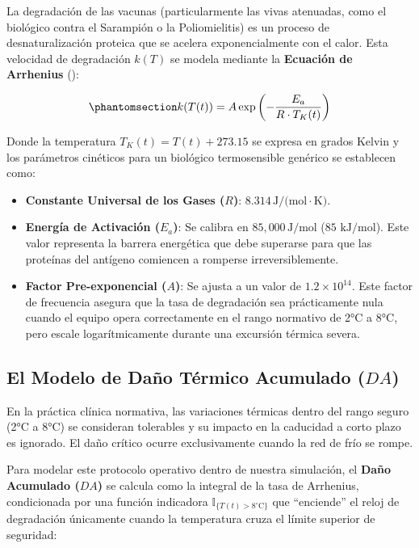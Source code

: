\documentclass[
  spanish,
  letterpaper,
  DIV=11,
  numbers=noendperiod]{scrreprt}
\providecommand{\tightlist}{%
  \setlength{\itemsep}{0pt}\setlength{\parskip}{0pt}}
\theoremstyle{plain}
\theoremstyle{definition}
\theoremstyle{remark}
\begin{document}
La degradación de las vacunas (particularmente las vivas atenuadas, como
el biológico contra el Sarampión o la Poliomielitis) es un proceso de
desnaturalización proteica que se acelera exponencialmente con el calor.
Esta velocidad de degradación \(k(T)\) se modela mediante la
\textbf{Ecuación de Arrhenius} ():

\begin{equation}\phantomsection\label{eq-Arrhenius}{
k(T(t)) = A \exp\left(-\frac{E_a}{R \cdot T_K(t)}\right)
}\end{equation}

Donde la temperatura \(T_K(t) = T(t) + 273.15\) se expresa en grados
Kelvin y los parámetros cinéticos para un biológico termosensible
genérico se establecen como:

\begin{itemize}
\tightlist
\item
  \textbf{Constante Universal de los Gases (\(R\))}:
  \(8.314 \, \text{J/(mol} \cdot \text{K)}\).
\item
  \textbf{Energía de Activación (\(E_a\))}: Se calibra en
  \textbf{\(85,000 \, \text{J/mol}\)} (\(85 \text{ kJ/mol}\)). Este
  valor representa la barrera energética que debe superarse para que las
  proteínas del antígeno comiencen a romperse irreversiblemente.
\item
  \textbf{Factor Pre-exponencial (\(A\))}: Se ajusta a un valor de
  \textbf{\(1.2 \times 10^{14}\)}. Este factor de frecuencia asegura que
  la tasa de degradación sea prácticamente nula cuando el equipo opera
  correctamente en el rango normativo de 2°C a 8°C, pero escale
  logarítmicamente durante una excursión térmica severa.
\end{itemize}

\subsection{\texorpdfstring{El Modelo de Daño Térmico Acumulado
(\(DA\))}{El Modelo de Daño Térmico Acumulado (DA)}}\label{el-modelo-de-dauxf1o-tuxe9rmico-acumulado-da}

En la práctica clínica normativa, las variaciones térmicas dentro del
rango seguro (2°C a 8°C) se consideran tolerables y su impacto en la
caducidad a corto plazo es ignorado. El daño crítico ocurre
exclusivamente cuando la red de frío se rompe.

Para modelar este protocolo operativo dentro de nuestra simulación, el
\textbf{Daño Acumulado (\(DA\))} se calcula como la integral de la tasa
de Arrhenius, condicionada por una función indicadora
\(\mathbb{I}_{\{T(t) > 8^\circ\text{C}\}}\) que ``enciende'' el reloj de
degradación únicamente cuando la temperatura cruza el límite superior de
seguridad:
\end{document}
